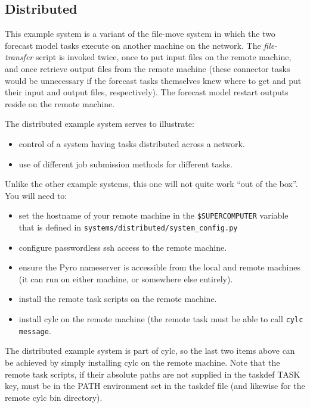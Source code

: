 \documentclass[11pt,a4paper]{article}
\begin{document}
\subsection{Distributed}

This example system is a variant of the file-move system in which the
two forecast model tasks execute on another machine on the network.  The
{\em file-transfer} script is invoked twice, once to put input files on
the remote machine, and once retrieve output files from the remote
machine (these connector tasks would be unnecessary if the forecast
tasks themselves knew where to get and put their input and output files,
respectively). The forecast model restart outputs reside on the remote
machine.

The distributed example system serves to illustrate:

\begin{itemize}
    \item control of a system having tasks distributed across a network.
    \item use of different job submission methods for different tasks.
\end{itemize}

Unlike the other example systems, this one will not quite work ``out of
the box''. You will need to:

\begin{itemize}
    \item set the hostname of your remote machine in the
        \lstinline=$SUPERCOMPUTER= variable that is defined in 
        \lstinline=systems/distributed/system_config.py=
    \item configure passwordless ssh access to the remote machine.
    \item ensure the Pyro nameserver is accessible from the local and
        remote machines (it can run on either machine, or somewhere else
        entirely).
    \item install the remote task scripts on the remote machine.
    \item install cylc on the remote machine (the remote task must be
        able to call \lstinline=cylc message=.
\end{itemize}

The distributed example system is part of cylc, so the last two items above
can be achieved by simply installing cylc on the remote machine.  Note that
the remote task scripts, if their absolute paths are not supplied in the
taskdef TASK key, must be in the PATH environment set in the taskdef
file (and likewise for the remote cylc bin directory).
\end{document}
